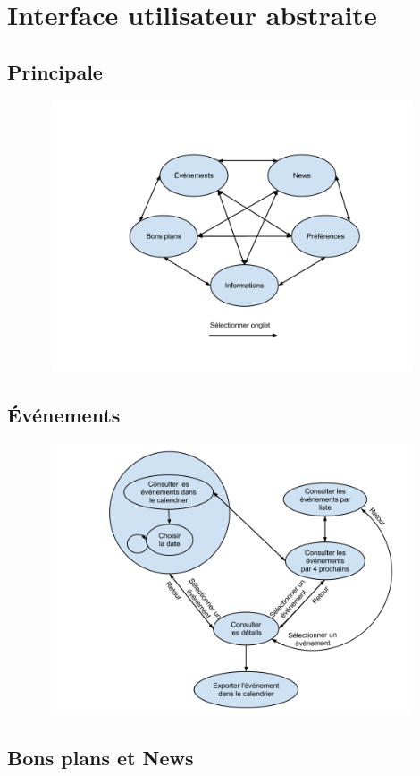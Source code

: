 \documentclass[a4paper, 11px]{article}
\begin{document}
\section{Interface utilisateur abstraite}
\subsection{Principale}
\vfill
\begin{figure}[h!]
\includegraphics[width=18cm,height=8cm]{IUAprincipale.png}
\end{figure}

\subsection{Événements}
\vfill
\begin{figure}[h!]
\includegraphics[width=18cm,height=8cm]{IUAevenements.png}
\end{figure}
\clearpage
\subsection{Bons plans et News}
\end{document}
